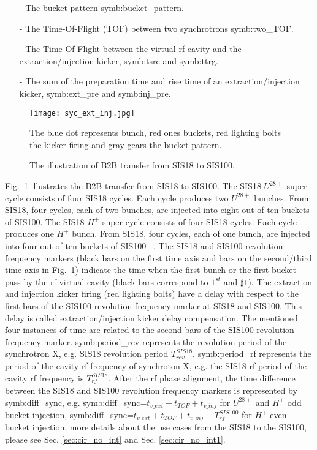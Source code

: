 \begin{itemize}
\item[-] The bucket pattern \gls{symb:bucket_pattern}.
\item[-] The Time-Of-Flight (\gls{TOF}) between two synchrotrons \gls{symb:two_TOF}. 
\item[-] The Time-Of-Flight between the virtual rf cavity and the extraction/injection kicker, \gls{symb:tsrc} and \gls{symb:ttrg}. 
\item[-] The sum of the preparation time and rise time of an extraction/injection kicker, \gls{symb:ext_pre} and \gls{symb:inj_pre}.
\end{itemize}
\begin{figure}[H]
   \centering   
   \texttt{[image: syc\_ext\_inj.jpg]}
   \caption{The illustration of B2B transfer from SIS18 to SIS100.}{The blue dot represents bunch, red ones buckets, red lighting bolts the kicker firing and gray gears the bucket pattern.}
   \label{ext_inj_kicker}
\end{figure}
Fig.~\ref{ext_inj_kicker} illustrates the B2B transfer from SIS18 to SIS100. The SIS18 $U^{28+}$ super cycle consists of four SIS18 cycles. Each cycle produces two $U^{28+}$ bunches. From SIS18, four cycles, each of two bunches, are injected into eight out of ten buckets of SIS100. The SIS18 $H^{+}$ super cycle consists of four SIS18 cycles. Each cycle produces one $H^{+}$ bunch. From SIS18, four cycles, each of one bunch, are injected into four out of ten buckets of SIS100 ~\cite{liebermann_fair_2013, liebermann_sis100_2013}. The SIS18 and SIS100 revolution frequency markers (black bars on the first time axis and bars on the second/third time axis in Fig.~\ref{ext_inj_kicker}) indicate the time when the first bunch or the first bucket pass by the rf virtual cavity (black bars correspond to $1^{st}$ and $\sharp1$). The extraction and injection kicker firing (red lighting bolts) have a delay with respect to the first bars of the SIS100 revolution frequency marker at SIS18 and SIS100. This delay is called extraction/injection kicker delay compensation. The mentioned four instances of time are related to the second bars of the SIS100 revolution frequency marker. \gls{symb:period_rev} represents the revolution period of the synchrotron X, e.g. SIS18 revolution period $T_{\mathit{rev}}^{\mathit{SIS18}}$. \gls{symb:period_rf} represents the period of the cavity rf frequency of synchroton X, e.g. the SIS18 rf period of the cavity rf frequency is $T_{\mathit{rf}}^{\mathit{SIS18}}$. After the rf phase alignment, the time difference between the SIS18 and SIS100 revolution frequency markers is represented by \gls{symb:diff_sync}, e.g. \gls{symb:diff_sync}=$t_{\mathit{v\_ext}}+t_{\mathit{TOF}}+t_{\mathit{v\_inj}}$ for $U^{28+}$ and $H^{+}$ odd bucket injection,  \gls{symb:diff_sync}=$t_{\mathit{v\_ext}}+t_{\mathit{TOF}}+t_{\mathit{v\_inj}}- T_{\mathit{rf}}^{\mathit{SIS100}}$ for $H^{+}$ even bucket injection, more details about the use cases from the SIS18 to the SIS100, please see Sec. \ref{sec:cir_no_int} and Sec.  \ref{sec:cir_no_int1}.
